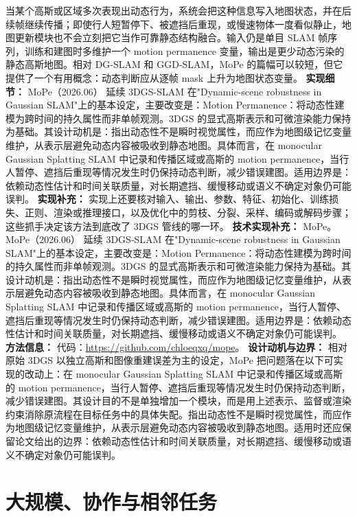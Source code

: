 当某个高斯或区域多次表现出动态行为，系统会把这种信息写入地图状态，并在后续帧继续传播；即使行人短暂停下、被遮挡后重现，或慢速物体一度看似静止，地图更新模块也不会立刻把它当作可靠静态结构融合。输入仍是单目 SLAM 帧序列，训练和建图时多维护一个 motion permanence 变量，输出是更少动态污染的静态高斯地图。相对 DG-SLAM 和 GGD-SLAM，MoPe 的篇幅可以较短，但它提供了一个有用概念：动态判断应从逐帧 mask 上升为地图状态变量。
\textbf{实现细节：} MoPe（2026.06） 延续 3DGS-SLAM 在"Dynamic-scene robustness in Gaussian SLAM"上的基本设定，主要改变是：Motion Permanence：将动态性建模为跨时间的持久属性而非单帧观测。3DGS 的显式高斯表示和可微渲染能力保持为基础。其设计动机是：指出动态性不是瞬时视觉属性，而应作为地图级记忆变量维护，从表示层避免动态内容被吸收到静态地图。具体而言，在 monocular Gaussian Splatting SLAM 中记录和传播区域或高斯的 motion permanence，当行人暂停、遮挡后重现等情况发生时仍保持动态判断，减少错误建图。适用边界是：依赖动态性估计和时间关联质量，对长期遮挡、缓慢移动或语义不确定对象仍可能误判。
\textbf{实现补充：} 实现上还要核对输入、输出、参数、特征、初始化、训练损失、正则、渲染或推理接口，以及优化中的剪枝、分裂、采样、编码或解码步骤；这些抓手决定该方法到底改了 3DGS 管线的哪一环。
\textbf{技术实现补充：} MoPe。MoPe（2026.06） 延续 3DGS-SLAM 在"Dynamic-scene robustness in Gaussian SLAM"上的基本设定，主要改变是：Motion Permanence：将动态性建模为跨时间的持久属性而非单帧观测。3DGS 的显式高斯表示和可微渲染能力保持为基础。其设计动机是：指出动态性不是瞬时视觉属性，而应作为地图级记忆变量维护，从表示层避免动态内容被吸收到静态地图。具体而言，在 monocular Gaussian Splatting SLAM 中记录和传播区域或高斯的 motion permanence，当行人暂停、遮挡后重现等情况发生时仍保持动态判断，减少错误建图。适用边界是：依赖动态性估计和时间关联质量，对长期遮挡、缓慢移动或语义不确定对象仍可能误判。
\textbf{方法信息：} 代码：\url{https://github.com/chloeqxq/mope}。
\textbf{设计动机与边界：} 相对原始 3DGS 以独立高斯和图像重建误差为主的设定，MoPe 把问题落在以下可实现的改动上：在 monocular Gaussian Splatting SLAM 中记录和传播区域或高斯的 motion permanence，当行人暂停、遮挡后重现等情况发生时仍保持动态判断，减少错误建图。其设计目的不是单独增加一个模块，而是用上述表示、监督或渲染约束消除原流程在目标任务中的具体失配。指出动态性不是瞬时视觉属性，而应作为地图级记忆变量维护，从表示层避免动态内容被吸收到静态地图。适用时还应保留论文给出的边界：依赖动态性估计和时间关联质量，对长期遮挡、缓慢移动或语义不确定对象仍可能误判。

\section{大规模、协作与相邻任务}

